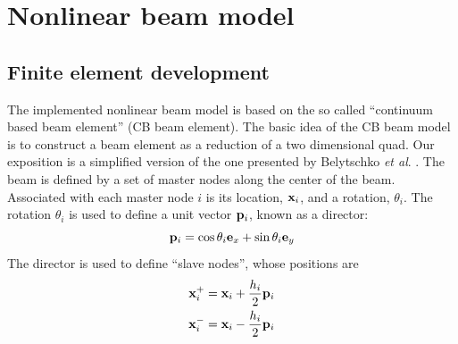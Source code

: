 \documentclass{article}
\begin{document}
\section{Nonlinear beam model}
\subsection{Finite element development}
The implemented nonlinear beam model is based on the so called ``continuum based beam element'' (CB beam element).  
The basic idea of the CB beam model is to construct a beam element as a reduction of a two dimensional quad.  
Our exposition is a simplified version of the one presented by Belytschko \emph{et al}. \cite{Belytschko2000}.
The beam is defined by a set of master nodes along the center of the beam.
Associated with each master node $i$ is its location, ${\bf x}_i$, and a rotation, $\theta_i$.  
The rotation $\theta_i$ is used to define a unit vector ${\bf p}_i$, known as a director:
\begin{equation} {\bf p}_i = \cos \theta _i {\bf e}_x + \sin \theta _i {\bf e}_y \label{eq:6700} \end{equation}
The director is used to define ``slave nodes'', whose positions are
\begin{subequations}
\begin{align}
  \label{eq:eq6800a}
 {\bf x}_i^+ &= {\bf x}_i + \frac{h_i}{2}{\bf p}_i  \\
  \label{eq:eq6800b}
 {\bf x}_i^- &= {\bf x}_i - \frac{h_i}{2}{\bf p}_i 
\end{align}
\end{subequations}
\end{document}
